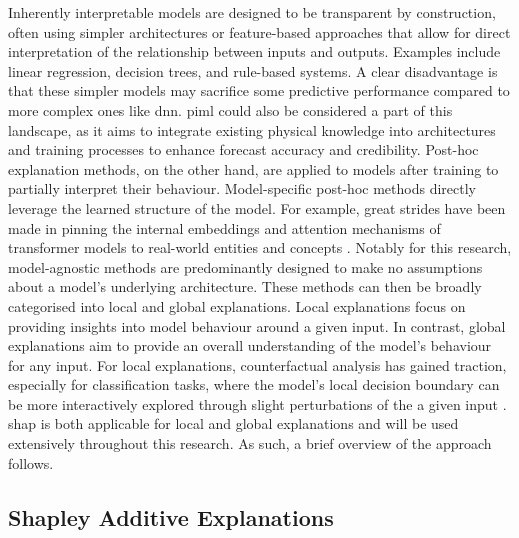 Inherently interpretable models are designed to be transparent by construction, often using simpler architectures or feature-based approaches that allow for direct interpretation of the relationship between inputs and outputs. Examples include linear regression, decision trees, and rule-based systems. A clear disadvantage is that these simpler models may sacrifice some predictive performance compared to more complex ones like \acrfull{dnn}. \acrshort{piml} could also be considered a part of this landscape, as it aims to integrate existing physical knowledge into architectures and training processes to enhance forecast accuracy and credibility. Post-hoc explanation methods, on the other hand, are applied to models after training to partially interpret their behaviour. Model-specific post-hoc methods directly leverage the learned structure of the model. For example, great strides have been made in pinning the internal embeddings and attention mechanisms of transformer models to real-world entities and concepts \citep{Lin2023}. Notably for this research, model-agnostic methods are predominantly designed to make no assumptions about a model's underlying architecture. These methods can then be broadly categorised into local and global explanations. Local explanations focus on providing insights into model behaviour around a given input. In contrast, global explanations aim to provide an overall understanding of the model's behaviour for any input. For local explanations, counterfactual analysis has gained traction, especially for classification tasks, where the model's local decision boundary can be more interactively explored through slight perturbations of the a given input \citep{Mothilal2019}. \acrfull{shap} is both applicable for local and global explanations and will be used extensively throughout this research. As such, a brief overview of the approach follows.

\subsection{Shapley Additive Explanations}

